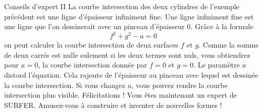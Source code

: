 \begin{surferPage}{Conseils d'expert II}
La courbe intersection des deux cylindres de l'exemple précédent est une ligne d'épaisseur infiniment fine. Une ligne infiniment fine est une ligne que l'on dessinerait avec un pinceau d'épaisseur 0. Grâce à la formule 
\[ f^2+g^2-a=0\]
on peut calculer la courbe intersection de deux surfaces $f$ et $g$. Comme la somme de deux carrés est nulle sulement si les deux termes sont nuls, vous obtiendrez pour $a=0$, la courbe intersection donnée par $f=0$ et $g=0$.
 Le paramètre $a$ distord l'équation. Cela rajoute de l'épaisseur au pinceau avec lequel est dessinée la courbe intersection. Si vous changez $a$, vous pouvez rendre la courbe intersection plus visible.
\newline \newline
Félicitations ! Vous êtes maintenant un expert de SURFER. Amusez-vous à construire et inventer de nouvelles formes !
\end{surferPage}

